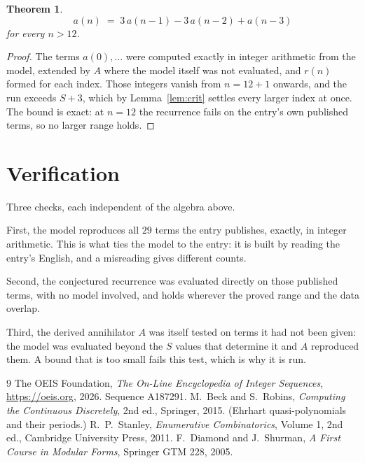 \documentclass[11pt,a4paper]{article}
\theoremstyle{plain}
\newtheorem{theorem}{Theorem}
\theoremstyle{definition}
\begin{document}
\begin{theorem}
\[
a(n)\;=\;3\,a(n-1) - 3\,a(n-2) + a(n-3)
\]
for every $n>12$.
\end{theorem}

\begin{proof}
The terms $a(0),\dots$ were computed exactly in integer arithmetic from the model, extended by
$A$ where the model itself was not evaluated, and $r(n)$ formed for each index. Those integers
vanish from $n=12+1$ onwards, and the run exceeds $S+3$, which by
Lemma~\ref{lem:crit} settles every larger index at once. The bound is exact: at $n=12$ the recurrence fails on the entry's own published terms, so no larger range holds.
\end{proof}

\section{Verification}

Three checks, each independent of the algebra above.

First, the model reproduces all $29$ terms the entry publishes, exactly, in integer
arithmetic. This is what ties the model to the entry: it is built by reading the entry's
English, and a misreading gives different counts.

Second, the conjectured recurrence was evaluated directly on those published terms, with no
model involved, and holds wherever the proved range and the data overlap.

Third, the derived annihilator $A$ was itself tested on terms it had not been given: the model
was evaluated beyond the $S$ values that determine it and $A$ reproduced them. A bound that is
too small fails this test, which is why it is run.

\begin{thebibliography}{9}
 The OEIS Foundation, \emph{The On-Line Encyclopedia of Integer
Sequences}, \url{https://oeis.org}, 2026. Sequence A187291.
 M.~Beck and S.~Robins, \emph{Computing the Continuous Discretely},
2nd ed., Springer, 2015. (Ehrhart quasi-polynomials and their periods.)
 R.~P.~Stanley, \emph{Enumerative Combinatorics}, Volume 1, 2nd ed.,
Cambridge University Press, 2011.
 F.~Diamond and J.~Shurman, \emph{A First Course in Modular Forms},
Springer GTM 228, 2005.
\end{thebibliography}
\end{document}
